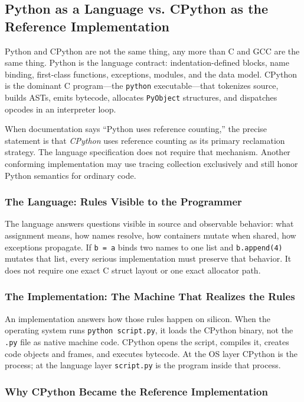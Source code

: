 \subsection{Python as a Language vs. CPython as the Reference Implementation}

Python and CPython are not the same thing, any more than C and GCC are the same thing. Python is the language contract: indentation-defined blocks, name binding, first-class functions, exceptions, modules, and the data model. CPython is the dominant C program---the \texttt{python} executable---that tokenizes source, builds ASTs, emits bytecode, allocates \texttt{PyObject} structures, and dispatches opcodes in an interpreter loop.

When documentation says ``Python uses reference counting,'' the precise statement is that \emph{CPython} uses reference counting as its primary reclamation strategy. The language specification does not require that mechanism. Another conforming implementation may use tracing collection exclusively and still honor Python semantics for ordinary code.

\subsubsection{The Language: Rules Visible to the Programmer}

The language answers questions visible in source and observable behavior: what assignment means, how names resolve, how containers mutate when shared, how exceptions propagate. If \texttt{b = a} binds two names to one list and \texttt{b.append(4)} mutates that list, every serious implementation must preserve that behavior. It does not require one exact C struct layout or one exact allocator path.

\subsubsection{The Implementation: The Machine That Realizes the Rules}

An implementation answers how those rules happen on silicon. When the operating system runs \texttt{python script.py}, it loads the CPython binary, not the \texttt{.py} file as native machine code. CPython opens the script, compiles it, creates code objects and frames, and executes bytecode. At the OS layer CPython is the process; at the language layer \texttt{script.py} is the program inside that process.

\subsubsection{Why CPython Became the Reference Implementation}

